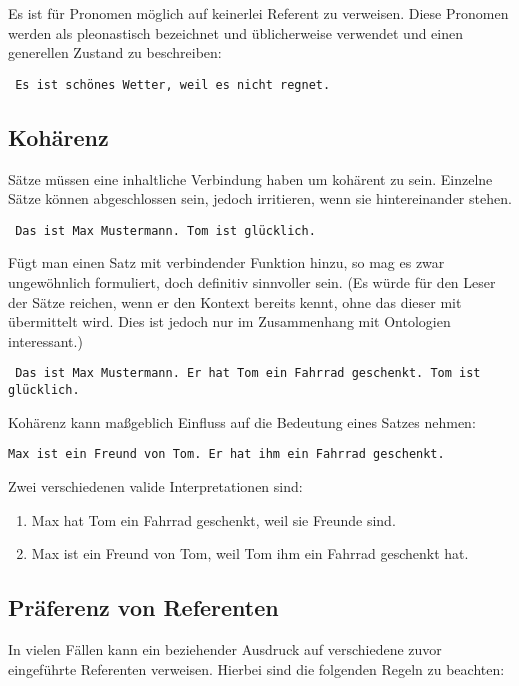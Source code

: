 \documentclass[12pt]{report}
\begin{document}
Es ist für Pronomen möglich auf keinerlei Referent zu verweisen. Diese Pronomen werden als pleonastisch bezeichnet und üblicherweise verwendet und einen generellen Zustand zu beschreiben:

\tt 
Es ist schönes Wetter, weil es nicht regnet.
\rm

\subsection{Kohärenz}
Sätze müssen eine inhaltliche Verbindung haben um kohärent zu sein. Einzelne Sätze können abgeschlossen sein, jedoch irritieren, wenn sie hintereinander stehen. 

\tt 
Das ist Max Mustermann. Tom ist glücklich.
\rm

Fügt man einen Satz mit verbindender Funktion hinzu, so mag es zwar ungewöhnlich formuliert, doch definitiv sinnvoller sein. (Es würde für den Leser der Sätze reichen, wenn er den Kontext bereits kennt, ohne das dieser mit übermittelt wird. Dies ist jedoch nur im Zusammenhang mit Ontologien interessant.)

\tt 
Das ist Max Mustermann. Er hat Tom ein Fahrrad geschenkt. Tom ist glücklich.
\rm

Kohärenz kann maßgeblich Einfluss auf die Bedeutung eines Satzes nehmen:

\tt Max ist ein Freund von Tom. Er hat ihm ein Fahrrad geschenkt. 

\rm

Zwei verschiedenen valide Interpretationen sind:

\begin{enumerate}
\item Max hat Tom ein Fahrrad geschenkt, weil sie Freunde sind.
\item Max ist ein Freund von Tom, weil Tom ihm ein Fahrrad geschenkt hat. 
\end{enumerate}

\subsection{Präferenz von Referenten}
In vielen Fällen kann ein beziehender Ausdruck auf verschiedene zuvor eingeführte Referenten verweisen. Hierbei sind die folgenden Regeln zu beachten:
\end{document}

